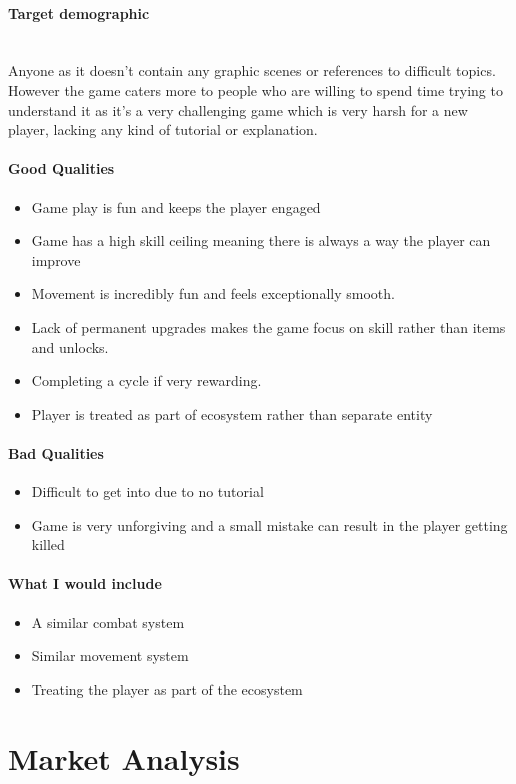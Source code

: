 \documentclass{article}
\newcommand{\myparagraph}[1]{\paragraph{#1}\mbox{}\\} %
\begin{document}
\myparagraph{Target demographic}
Anyone as it doesn't contain any graphic scenes or references to difficult topics. However the game caters more to people who are willing to spend time trying to understand it as it's a very challenging game which is very harsh for a new player, lacking any kind of tutorial or explanation. 

\paragraph{Good Qualities}
\begin{itemize}
\item Game play is fun and keeps the player engaged
\item Game has a high skill ceiling meaning there is always a way the player can improve 
\item Movement is incredibly fun and feels exceptionally smooth. 
\item Lack of permanent upgrades makes the game focus on skill rather than items and unlocks.
\item Completing a cycle if very rewarding.
\item Player is treated as part of ecosystem rather than separate entity
\end{itemize}

\paragraph{Bad Qualities}
\begin{itemize}
\item Difficult to get into due to no tutorial
\item Game is very unforgiving and a small mistake can result in the player getting killed
\end{itemize}

\paragraph{What I would include}
\begin{itemize}
\item A similar combat system 
\item Similar movement system
\item Treating the player as part of the ecosystem
\end{itemize}

\section{Market Analysis}
\end{document}
